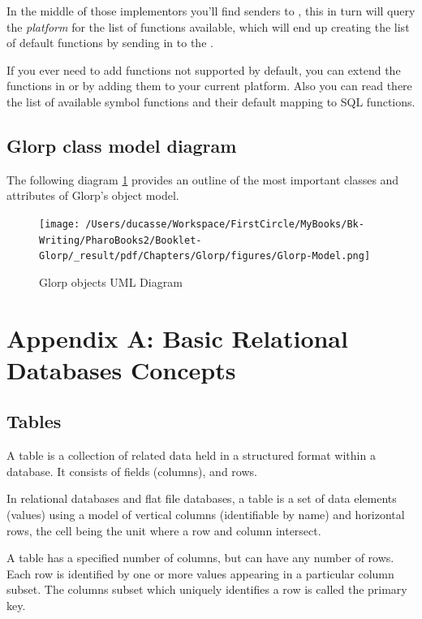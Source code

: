 \documentclass[10pt,twoside,english]{_support/latex/sbabook/sbabook}
\begin{document}
In the middle of those implementors you'll find senders to
, this in turn will query the \textit{platform}
for the list of functions available, which will end up creating
the list of default functions by sending 
in to the .

If you ever need to add functions not supported by default, you can extend
the functions in 
or by adding them to your current platform. Also you can read there the list
of available symbol functions and their default mapping to SQL functions.
\section{Glorp class model diagram}
The following diagram \ref{glorpObjectModel} provides an outline of the most important classes and
attributes of Glorp's object model.


\begin{figure}

\begin{center}
\texttt{[image: /Users/ducasse/Workspace/FirstCircle/MyBooks/Bk-Writing/PharoBooks2/Booklet-Glorp/\_result/pdf/Chapters/Glorp/figures/Glorp-Model.png]}\caption{Glorp objects UML Diagram\label{glorpObjectModel}}\end{center}
\end{figure}

\chapter{Appendix A: Basic Relational Databases Concepts}\section{Tables}
A table is a collection of related data held in a structured format within a database.
It consists of fields (columns), and rows.

In relational databases and flat file databases, a table is a set of data
elements (values) using a model of vertical columns (identifiable by name)
and horizontal rows, the cell being the unit where a row and column intersect.

A table has a specified number of columns, but can have any number of rows.
Each row is identified by one or more values appearing in a particular column
subset. The columns subset which uniquely identifies a row is called the
primary key.
\end{document}

